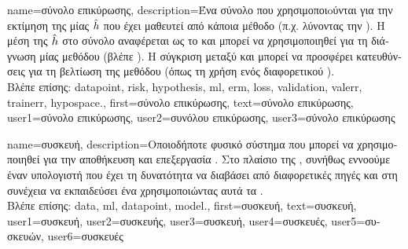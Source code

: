 {name={\foreignlanguage{greek}{σύνολο επικύρωσης}},
 	description={\foreignlanguage{greek}{Ένα σύνολο}  \foreignlanguage{greek}{που 
  		χρησιμοποι\-oύ\-νται για την εκτίμηση της}  \foreignlanguage{greek}{μίας}  $\hat{h}$ 
		\foreignlanguage{greek}{που έχει μαθευτεί από κάποια μέθοδο}  \foreignlanguage{greek}{(π.χ. λύνοντας την} ). 
		\foreignlanguage{greek}{Η μέση}  \foreignlanguage{greek}{της} $\hat{h}$ 
  		\foreignlanguage{greek}{στο σύνολο}  \foreignlanguage{greek}{αναφέρεται ως το}  
		\foreignlanguage{greek}{και μπορεί να χρησιμοποιηθεί για τη διάγνωση μίας μεθόδου}  (\foreignlanguage{greek}{βλέπε} 
		\cite[Sec. 6.6]{MLBasics}). \foreignlanguage{greek}{Η σύγκριση μεταξύ}  \foreignlanguage{greek}{και}  
		\foreignlanguage{greek}{μπορεί να προσφέρει κατευθύνσεις για τη βελτίωση της μεθόδου}  \foreignlanguage{greek}{(όπως τη 
		χρήση ενός διαφορετικού} ).\\
		\foreignlanguage{greek}{Βλέπε επίσης:} \gls{datapoint}, \gls{risk}, \gls{hypothesis}, \gls{ml}, \gls{erm}, \gls{loss}, \gls{validation}, \gls{valerr}, 
		\gls{trainerr}, \gls{hypospace}.},
	first={\foreignlanguage{greek}{σύνολο επικύρωσης}},
	text={\foreignlanguage{greek}{σύνολο επικύρωσης}},
	user1={\foreignlanguage{greek}{σύνολο επικύρωσης}}, %
	user2={\foreignlanguage{greek}{συνόλου επικύρωσης}}, %
	user3={\foreignlanguage{greek}{σύνολο επικύρωσης}} %
}

{name={\foreignlanguage{greek}{συσκευή}},
	description={\foreignlanguage{greek}{Οποιοδήποτε φυσικό σύστημα που μπορεί να χρησιμοποιηθεί} 
		\foreignlanguage{greek}{για την αποθήκευση και επεξεργασία} . \foreignlanguage{greek}{Στο πλαίσιο της} , 
		\foreignlanguage{greek}{συνήθως εννοούμε έναν υπολογιστή που έχει τη δυνατότητα να διαβάσει}  
		\foreignlanguage{greek}{από διαφορετικές πηγές και στη συνέχεια να εκπαιδεύσει ένα}   
		\foreignlanguage{greek}{χρησιμοποιώντας αυτά τα} .\\
		\foreignlanguage{greek}{Βλέπε επίσης:} \gls{data}, \gls{ml}, \gls{datapoint}, \gls{model}.},
	first={\foreignlanguage{greek}{συσκευή}},
	text={\foreignlanguage{greek}{συσκευή}},
	user1={\foreignlanguage{greek}{συσκευή}}, %
	user2={\foreignlanguage{greek}{συσκευής}}, %
	user3={\foreignlanguage{greek}{συσκευή}}, %
	user4={\foreignlanguage{greek}{συσκευές}}, %
	user5={\foreignlanguage{greek}{συσκευών}}, %
	user6={\foreignlanguage{greek}{συσκευές}} %
}

